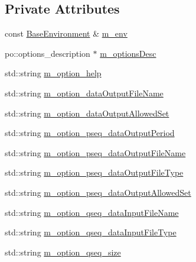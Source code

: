 \subsection*{Private Attributes}
\begin{DoxyCompactItemize}
\item 
const \hyperlink{class_q_u_e_s_o_1_1_base_environment}{Base\-Environment} \& \hyperlink{class_q_u_e_s_o_1_1_monte_carlo_s_g_options_a16b93142f6a249ccf1d07de964fec2ef}{m\-\_\-env}
\item 
po\-::options\-\_\-description $\ast$ \hyperlink{class_q_u_e_s_o_1_1_monte_carlo_s_g_options_a233cc25a5ce7af85c0464ca89341d008}{m\-\_\-options\-Desc}
\item 
std\-::string \hyperlink{class_q_u_e_s_o_1_1_monte_carlo_s_g_options_a604e9d58aa974b08eb38d70199c5d654}{m\-\_\-option\-\_\-help}
\item 
std\-::string \hyperlink{class_q_u_e_s_o_1_1_monte_carlo_s_g_options_a057b072e55710c5effa4a5016e1d93ab}{m\-\_\-option\-\_\-data\-Output\-File\-Name}
\item 
std\-::string \hyperlink{class_q_u_e_s_o_1_1_monte_carlo_s_g_options_a169218cf0b3d8d8035bb826a963f5e11}{m\-\_\-option\-\_\-data\-Output\-Allowed\-Set}
\item 
std\-::string \hyperlink{class_q_u_e_s_o_1_1_monte_carlo_s_g_options_a38f56157a49d08a3fd6a837d95250f8b}{m\-\_\-option\-\_\-pseq\-\_\-data\-Output\-Period}
\item 
std\-::string \hyperlink{class_q_u_e_s_o_1_1_monte_carlo_s_g_options_a52759ecc968b903de4d651127f6e9a03}{m\-\_\-option\-\_\-pseq\-\_\-data\-Output\-File\-Name}
\item 
std\-::string \hyperlink{class_q_u_e_s_o_1_1_monte_carlo_s_g_options_af894e246867b1b73f66322df656c44c8}{m\-\_\-option\-\_\-pseq\-\_\-data\-Output\-File\-Type}
\item 
std\-::string \hyperlink{class_q_u_e_s_o_1_1_monte_carlo_s_g_options_a496b1325324965abbeffd3ef8b919975}{m\-\_\-option\-\_\-pseq\-\_\-data\-Output\-Allowed\-Set}
\item 
std\-::string \hyperlink{class_q_u_e_s_o_1_1_monte_carlo_s_g_options_adfa1e97f82f761f277721e3002fa5be5}{m\-\_\-option\-\_\-qseq\-\_\-data\-Input\-File\-Name}
\item 
std\-::string \hyperlink{class_q_u_e_s_o_1_1_monte_carlo_s_g_options_a93530ee50a7e47ad57b46ca6cf04a60c}{m\-\_\-option\-\_\-qseq\-\_\-data\-Input\-File\-Type}
\item 
std\-::string \hyperlink{class_q_u_e_s_o_1_1_monte_carlo_s_g_options_ab720df7bb4ec0dbffd231de174d30423}{m\-\_\-option\-\_\-qseq\-\_\-size}

\end{DoxyCompactItemize}
